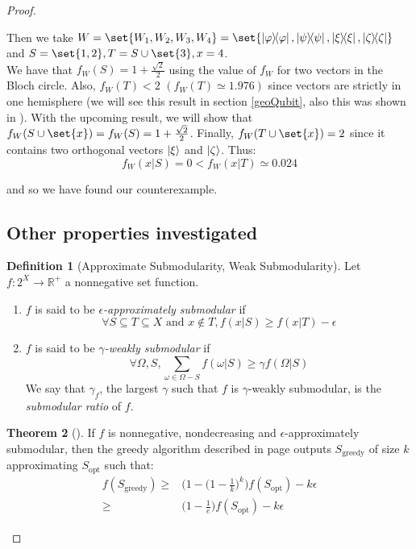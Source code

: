 \documentclass{article}
\theoremstyle{definition}
\newtheorem{theo}{Theorem}[section]
\newtheorem{defi}[theo]{Definition}
\theoremstyle{remark}
\begin{document}
\begin{proof}
\begin{enumerate}[label={(\arabic*)}]
      Then we take $W = \set{W_1,W_2,W_3,W_4} = \set{\dyad{\varphi},\dyad{\psi},\dyad{\xi},\dyad{\zeta}}$ and $S = \set{1,2}, T = S \cup \set{3}, x = 4$.\\
      We have that $f_W(S) = 1+\frac{\sqrt{2}}{2}$ using the value of $f_W$ for two vectors in the Bloch circle. Also, $f_W(T) < 2$ $(f_W(T) \simeq 1.976)$ since vectors are strictly in one hemisphere (we will see this result in section \ref{geoQubit}, also this was shown in \cite{Hunter04}).
      With the upcoming result, we will show that $f_W(S \cup \set{x}) = f_W(S) = 1+\frac{\sqrt{2}}{2}$. Finally, $f_W(T \cup \set{x}) = 2$ since it contains two orthogonal vectors $\ket{\xi}$ and $\ket{\zeta}$. Thus: \[f_W(x|S) = 0 < f_W(x|T) \simeq 0.024\]

      and so we have found our counterexample.
    \end{enumerate}

    \subsection{Other properties investigated}
    \begin{defi}[Approximate Submodularity, Weak Submodularity]
      Let $f : 2^X \rightarrow \mathbb{R}^+$ a nonnegative set function.
      \begin{enumerate}[label={(\arabic*)}]
      \item $f$ is said to be \emph{$\epsilon$-approximately submodular} \cite{KSC08,KC10} if
        \[ \forall S \subseteq T \subseteq X \text{ and } x \not\in T, f(x|S) \geq f(x|T) - \epsilon\]
      \item $f$ is said to be \emph{$\gamma$-weakly submodular} \cite{DK11,BBKT17} if
        \[ \forall \Omega,S, \underset{\omega \in \Omega - S}{\sum} f(\omega|S) \geq \gamma f(\Omega|S) \]
        We say that $\gamma_f$, the largest $\gamma$ such that $f$ is $\gamma$-weakly submodular, is the \emph{submodular ratio} of $f$.
      \end{enumerate}
    \end{defi}

    \begin{theo}[\cite{KSC08}]
      If $f$ is nonnegative, nondecreasing and  $\epsilon$-approximately submodular, then the greedy algorithm described in page \pageref{greedy} outputs $S_{\text{greedy}}$ of size $k$ approximating $S_{\text{opt}}$ such that:
      \begin{equation}
        \begin{aligned}
          f(S_{\text{greedy}}) \geq& \Big(1-\Big(1-\frac{1}{k}\Big)^k\Big)f(S_{\text{opt}}) - k\epsilon\\
          \geq& \Big(1-\frac{1}{e}\Big)f(S_{\text{opt}}) - k\epsilon
        \end{aligned}
      \end{equation}
    \end{theo}


\end{proof}
\end{document}
